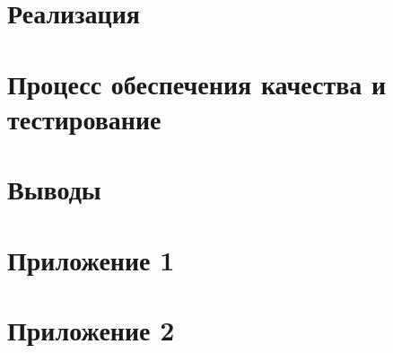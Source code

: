 \section{Реализация}


\section{Процесс обеспечения качества и тестирование}


\section{Выводы}


\section{Приложение 1}

\section{Приложение 2}

